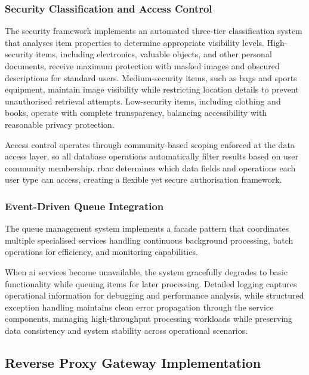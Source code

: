 \subsubsection{Security Classification and Access Control}

The security framework implements an automated three-tier classification system that analyses item properties to determine appropriate visibility levels. High-security items, including electronics, valuable objects, and other personal documents, receive maximum protection with masked images and obscured descriptions for standard users. Medium-security items, such as bags and sports equipment, maintain image visibility while restricting location details to prevent unauthorised retrieval attempts. Low-security items, including clothing and books, operate with complete transparency, balancing accessibility with reasonable privacy protection.

Access control operates through community-based scoping enforced at the data access layer, so all database operations automatically filter results based on user community membership. \ac{rbac} determines which data fields and operations each user type can access, creating a flexible yet secure authorisation framework.

\subsubsection{Event-Driven Queue Integration}

The queue management system implements a facade pattern that coordinates multiple specialised services handling continuous background processing, batch operations for efficiency, and monitoring capabilities.

When \ac{ai} services become unavailable, the system gracefully degrades to basic functionality while queuing items for later processing. Detailed logging captures operational information for debugging and performance analysis, while structured exception handling maintains clean error propagation through the service components, managing high-throughput processing workloads while preserving data consistency and system stability across operational scenarios.

\subsection{Reverse Proxy Gateway Implementation} \label{subsection:reverse_proxy_gateway}

